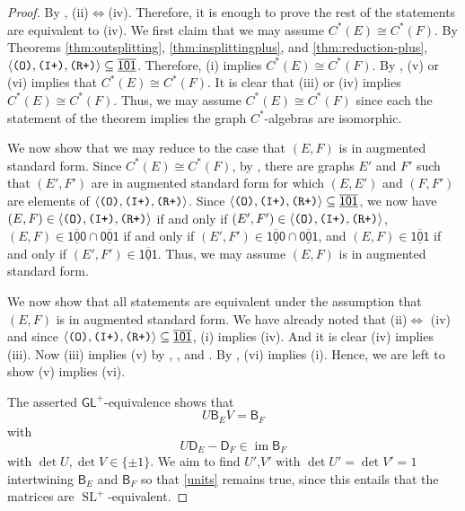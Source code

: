 \documentclass[12pt]{amsbook}%
\newcommand{\BB}{\mathsf B}
\newcommand{\DD}{\mathsf D}
\theoremstyle{defin}
\theoremstyle{remark}
\numberwithin{equation}{chapter}
\numberwithin{theor}{section}
\newcommand{\xyzrel}[1]{\mbox{$\overline{\underline{\mathsf{ #1}}}$}}
\newcommand{\IIIp}{\mbox{\texttt{\textup{(I+)}}}}
\newcommand{\OOO}{\mbox{\texttt{\textup{(O)}}}}
\newcommand{\RRRp}{\mbox{\texttt{\textup{(R+)}}}}
\begin{document}
  \begin{proof}
By  \cite{seaseer:dcdpgc}, (ii)$\Longleftrightarrow $(iv).  Therefore, it is enough to prove the rest of the statements are equivalent to (iv).  We first claim that we may assume $C^*(E) \cong C^*(F)$.  By Theorems \ref{thm:outsplitting}, \ref{thm:insplittingplus}, and \ref{thm:reduction-plus}, $\langle \OOO,\IIIp,\RRRp\rangle \subseteq \xyzrel{101}$.  Therefore, (i) implies $C^*(E) \cong C^*(F)$.  By \cite[Corollary~3.6]{segrerapws:ccuggs}, (v) or (vi) implies that $C^*(E) \cong C^*(F)$.  It is clear that (iii) or (iv) implies $C^*(E) \cong C^*(F)$.  Thus, we may assume $C^*(E) \cong C^*(F)$ since each the statement of the theorem implies the graph $C^*$-algebras are isomorphic.

We now show that we may reduce to the case that $(E, F)$ is in augmented standard form.  Since $C^*(E) \cong C^*(F)$, by \cite[Lemma~5.2]{seaseer:gciugc}, there are graphs $E'$ and $F'$ such that $(E', F')$ are in augmented standard form for which $(E,E')$ and $(F,F')$ are elements of $\langle \OOO,\IIIp,\RRRp\rangle$.  Since $\langle \OOO,\IIIp,\RRRp\rangle \subseteq \xyzrel{101}$, we now have $(E,F)\in\langle \OOO,\IIIp,\RRRp\rangle$ if and only if $(E',F')\in\langle \OOO,\IIIp,\RRRp\rangle$, $(E,F)\in\xyzrel{100}\cap \xyzrel{001}$ if and only if $(E',F')\in\xyzrel{100}\cap \xyzrel{001}$, and  $(E,F)\in\xyzrel{101}$ if and only if  $(E',F')\in\xyzrel{101}$.  Thus, we may assume $(E, F)$ is in augmented standard form.





We now show that all statements are equivalent under the assumption that $(E, F)$ is in augmented standard form.  We have already noted that  (ii)$\Longleftrightarrow$ (iv) and since $\langle \OOO,\IIIp,\RRRp\rangle \subseteq \xyzrel{101}$, (i) implies (iv).  And it is clear (iv) implies (iii).  Now (iii) implies (v) by \cite[Corollary~6.3]{ceor:coe}, \cite[Theorem~3.1]{mb:fesftpf}, and \cite[Theorem~14.6]{segrerapws:ccuggs}.  By \cite[Theorem~5.4]{seaseer:gciugc}, (vi) implies (i).  Hence, we are left to show (v) implies (vi).

The asserted $\mathsf{GL}^+$-equivalence shows that \begin{equation}U\BB_EV=\BB_F\label{intertwine}\end{equation} with \begin{equation}\label{units}U\DD_E-\DD_F\in \operatorname{im}\BB_F\end{equation}  with $\det U,\det V\in\{\pm 1\}$.
We aim to find $U'$,$V'$ with  $\det U'=\det V'=1$ intertwining $\BB_E$ and $\BB_F$ so that \eqref{units} remains true, since this entails that the matrices are $\operatorname{SL}^+$-equivalent.  


\end{proof}
\end{document}
